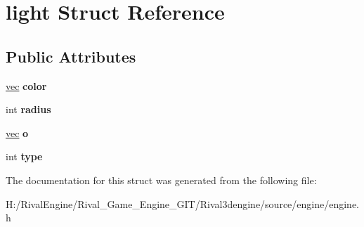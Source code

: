 \hypertarget{structlight}{}\section{light Struct Reference}
\label{structlight}
\subsection*{Public Attributes}
\begin{DoxyCompactItemize}
\item 
\mbox{\label{structlight_ae6fb3f49b6213268f93015024c7be7ad}} 
\hyperlink{structvec}{vec} {\bfseries color}
\item 
\mbox{\label{structlight_a4c7360a28ec9d6816cf015b80d8ec0e7}} 
int {\bfseries radius}
\item 
\mbox{\label{structlight_a833689d7473f56a98da6c445b49b6e85}} 
\hyperlink{structvec}{vec} {\bfseries o}
\item 
\mbox{\label{structlight_a778aadbc13e863fe0dc3b8fd13c97b49}} 
int {\bfseries type}
\end{DoxyCompactItemize}


The documentation for this struct was generated from the following file\+:\begin{DoxyCompactItemize}
\item 
H\+:/\+Rival\+Engine/\+Rival\+\_\+\+Game\+\_\+\+Engine\+\_\+\+G\+I\+T/\+Rival3dengine/source/engine/engine.\+h\end{DoxyCompactItemize}
